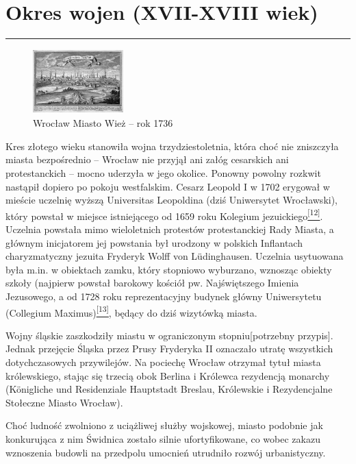 \documentclass{article}
\begin{document}
\section{Okres wojen (XVII-XVIII wiek)}
\noindent\rule{\textwidth}{0.4pt}

\begin{figure}
    \includegraphics[width = 3.5cm,height =2.5cm]{images/Zdjecie05.jpg}
    \caption{Wrocław Miasto Wież – rok 1736}
\end{figure}

Kres złotego wieku stanowiła wojna trzydziestoletnia, która choć nie zniszczyła miasta bezpośrednio – Wrocław nie przyjął ani załóg cesarskich ani protestanckich – mocno uderzyła w jego okolice. Ponowny powolny rozkwit nastąpił dopiero po pokoju westfalskim. Cesarz Leopold I w 1702 erygował w mieście uczelnię wyższą Universitas Leopoldina (dziś Uniwersytet Wrocławski), który powstał w miejsce istniejącego od 1659 roku Kolegium jezuickiego\hyperlink{12}{\textsuperscript{[12]}}. Uczelnia powstała mimo wieloletnich protestów protestanckiej Rady Miasta, a głównym inicjatorem jej powstania był urodzony w polskich Inflantach charyzmatyczny jezuita Fryderyk Wolff von Lüdinghausen. Uczelnia usytuowana była m.in. w obiektach zamku, który stopniowo wyburzano, wznosząc obiekty szkoły (najpierw powstał barokowy kościół pw. Najświętszego Imienia Jezusowego, a od 1728 roku reprezentacyjny budynek główny Uniwersytetu (Collegium Maximus)\hyperlink{13}{\textsuperscript{[13]}}, będący do dziś wizytówką miasta.

Wojny śląskie zaszkodziły miastu w ograniczonym stopniu[potrzebny przypis]. Jednak przejęcie Śląska przez Prusy Fryderyka II oznaczało utratę wszystkich dotychczasowych przywilejów. Na pociechę Wrocław otrzymał tytuł miasta królewskiego, stając się trzecią obok Berlina i Królewca rezydencją monarchy (Königliche und Residenziale Hauptstadt Breslau, Królewskie i Rezydencjalne Stołeczne Miasto Wrocław).

Choć ludność zwolniono z uciążliwej służby wojskowej, miasto podobnie jak konkurująca z nim Świdnica zostało silnie ufortyfikowane, co wobec zakazu wznoszenia budowli na przedpolu umocnień utrudniło rozwój urbanistyczny.
\newpage
\end{document}
